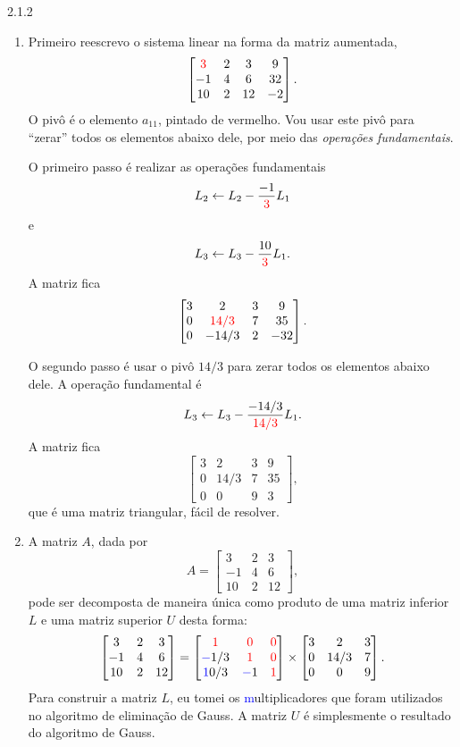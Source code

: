 \begin{Solucao}{2.1.2}
\begin{enumerate}[label=\alph*)]
\item Primeiro reescrevo o sistema linear na forma da matriz aumentada,
$$\begin{bmatrix}
{\color{red}3}	& 2 & 3 & 9 \\
-1			& 4 & 6	& 32 \\
10			& 2 & 12 & -2
\end{bmatrix}.$$
O pivô é o elemento $a_{11}$, pintado de vermelho. Vou usar este pivô para ``zerar'' todos os elementos abaixo dele, por meio das \emph{operações fundamentais}.

O primeiro passo é realizar as operações fundamentais $$L_2\leftarrow L_2 - \frac{-1}{{\color{red}3}}L_1$$ e $$L_3\leftarrow L_3 - \frac{10}{{\color{red}3}}L_1.$$ A matriz fica
$$\begin{bmatrix}
3			& 2 & 3 & 9 \\
0			& {\color{red}14/3} & 7	& 35 \\
0			& -14/3 & 2 & -32
\end{bmatrix}.$$


O segundo passo é usar o pivô $14/3$ para zerar todos os elementos abaixo dele. A operação fundamental é $$L_3\leftarrow L_3 - \frac{-14/3}{{\color{red}14/3}}L_1.$$
A matriz fica
$$\begin{bmatrix}
3			& 2 & 3 & 9 \\
0			& 14/3 & 7	& 35 \\
0			& 0 & 9 & 3
\end{bmatrix},$$
que é uma matriz triangular, fácil de resolver.

\item A matriz $A$, dada por $$A=\begin{bmatrix}
3	&2	&3\\
-1	&4	&6\\
10	&2	&12
\end{bmatrix},$$
pode ser decomposta de maneira única como produto de uma matriz inferior $L$ e uma matriz superior $U$ desta forma:
$$\begin{bmatrix}
3	&2	&3\\
-1	&4	&6\\
10	&2	&12
\end{bmatrix}=
\begin{bmatrix}
{\textcolor{red}1}	&{\textcolor{red}0}	&{\textcolor{red}0}\\
{\textcolor{blue}-1/3 }	&{\textcolor{red}1}	&{\textcolor{red}0}\\
{\textcolor{blue} 10/3 }	&{\textcolor{blue}-1}	&{\textcolor{red}1}
\end{bmatrix}\times
\begin{bmatrix}
3	&2	&3\\
0	&14/3	&7\\
0	&0	&9
\end{bmatrix}.$$
Para construir a matriz $L$, eu tomei os {\textcolor{blue} multiplicadores} que foram utilizados no algoritmo de eliminação de Gauss. A matriz $U$ é simplesmente o resultado do algoritmo de Gauss.



\end{enumerate}
\end{Solucao}
